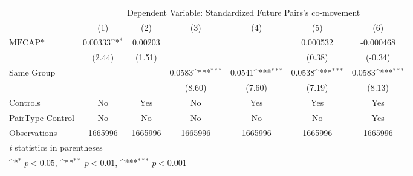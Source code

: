{
\def\sym#1{\ifmmode^{#1}\else\(^{#1}\)\fi}
\begin{tabular}{l*{6}{c}}
\hline\hline
                &\multicolumn{6}{c}{Dependent Variable: Standardized Future Pairs's co-movement}                                  \\\cmidrule(lr){2-7}
                &\multicolumn{1}{c}{(1)}         &\multicolumn{1}{c}{(2)}         &\multicolumn{1}{c}{(3)}         &\multicolumn{1}{c}{(4)}         &\multicolumn{1}{c}{(5)}         &\multicolumn{1}{c}{(6)}         \\
\hline
$ \text{MFCAP*} $&  0.00333\sym{*}  &  0.00203         &                  &                  & 0.000532         &-0.000468         \\
                &   (2.44)         &   (1.51)         &                  &                  &   (0.38)         &  (-0.34)         \\
[1em]
Same Group      &                  &                  &   0.0583\sym{***}&   0.0541\sym{***}&   0.0538\sym{***}&   0.0583\sym{***}\\
                &                  &                  &   (8.60)         &   (7.60)         &   (7.19)         &   (8.13)         \\
\hline
Controls        &       No         &      Yes         &       No         &      Yes         &      Yes         &      Yes         \\
PairType Control&       No         &       No         &       No         &       No         &       No         &      Yes         \\
Observations    &  1665996         &  1665996         &  1665996         &  1665996         &  1665996         &  1665996         \\
\hline\hline
\multicolumn{7}{l}{\footnotesize \textit{t} statistics in parentheses}\\
\multicolumn{7}{l}{\footnotesize \sym{*} \(p<0.05\), \sym{**} \(p<0.01\), \sym{***} \(p<0.001\)}\\
\end{tabular}
}
